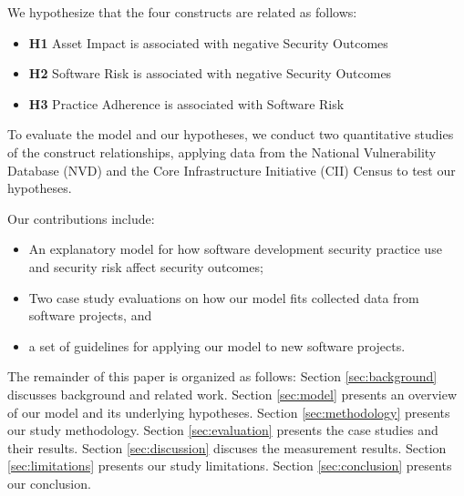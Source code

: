 We hypothesize that the four constructs are related as follows:
\begin{itemize}
	\item \textbf{H1} Asset Impact is associated with negative Security Outcomes
	\item \textbf{H2} Software Risk is associated with negative Security Outcomes
	\item \textbf{H3} Practice Adherence is associated with Software Risk 	
\end{itemize}
	
To evaluate the model and our hypotheses, we conduct two quantitative studies of the construct relationships, applying data from the National Vulnerability Database (NVD) and the Core Infrastructure Initiative (CII) Census to test our hypotheses.
  
Our contributions include:
\begin{itemize}
\item An explanatory model for how software development security practice use and security risk affect security outcomes;
\item Two case study evaluations on how our model fits collected data from software projects, and
\item a set of guidelines for applying our model to new software projects. 
\end{itemize}
The remainder of this paper is organized as follows:  Section \ref{sec:background} discusses background and related work. Section \ref{sec:model} presents an overview of our model and its underlying hypotheses. Section \ref{sec:methodology} presents our study methodology. Section \ref{sec:evaluation} presents the case studies and their results. Section \ref{sec:discussion} discuses the measurement results. Section \ref{sec:limitations} presents our study limitations. Section \ref{sec:conclusion} presents our conclusion.